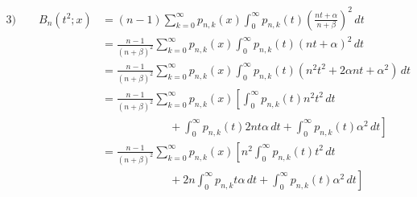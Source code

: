 \begin{align*}
3)\qquad	B_n(t^2; x) &= (n-1) \sum_{k=0}^{\infty} p_{n, k}(x) \int_{0}^{\infty} p_{n, k}(t) \left(\frac{nt+\alpha}{n + \beta}\right)^2\, dt \\
	&= \frac{n-1}{(n+\beta)^2} \sum_{k=0}^{\infty} p_{n, k}(x) \int_{0}^{\infty} p_{n, k}(t) (nt + \alpha)^2 \, dt\\
	&= \frac{n-1}{(n+\beta)^2} \sum_{k=0}^{\infty} p_{n, k}(x) \int_{0}^{\infty} p_{n, k}(t) (n^2t^2 + 2\alpha n t + \alpha^2) \, dt\\
	&= \frac{n-1}{(n+\beta)^2} \sum_{k=0}^{\infty} p_{n, k}(x) \left[
	\int_{0}^{\infty} p_{n, k}(t) n^2 t^2 \, dt 
	\right.\\
	& \qquad\qquad\qquad + \left.\int_{0}^{\infty} p_{n, k}(t) 2 n t \alpha \, dt + \int_{0}^{\infty} p_{n, k}(t) \alpha^2 \, dt \right]\\
	&= \frac{n-1}{(n+\beta)^2} \sum_{k=0}^{\infty} p_{n, k}(x) \left[
	n^2 \int_{0}^{\infty} p_{n, k}(t) t^2 \, dt 
	\right.\\
	& \qquad\qquad\qquad + \left. 2n\int_{0}^{\infty} p_{n, k} t \alpha \, dt + \int_{0}^{\infty} p_{n, k}(t) \alpha^2 \, dt \right]
\end{align*}
